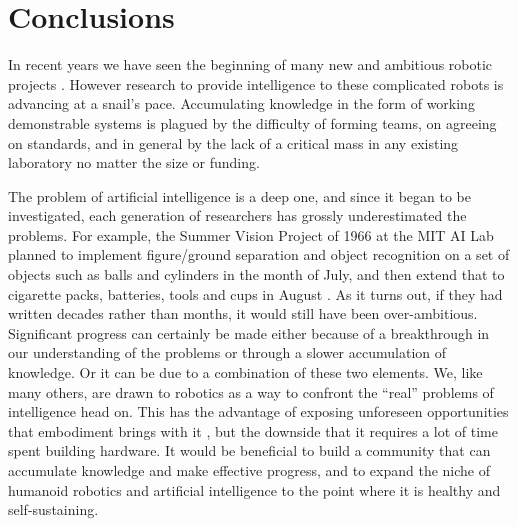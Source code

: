
\section{Conclusions}

In recent years we have seen the beginning of many new and 
ambitious robotic projects 
\cite{02-c59-Hirai-1998,02-c59-Kaneko-2004,adams00humanoid,02-c59-Sakagami-2002}. 
%
However research to provide intelligence 
to these complicated robots is advancing at a snail's pace.
%
Accumulating knowledge in the form of working demonstrable systems is 
plagued by the difficulty of forming teams, on agreeing on standards, and 
in general by the lack of a critical mass in any existing laboratory no 
matter the size or funding. 

The problem of artificial intelligence is a deep one, and since
it began to be investigated, each
generation of researchers has grossly underestimated the problems.
%
For example, the Summer Vision Project of 1966 at the
MIT AI Lab planned to implement figure/ground separation
and object recognition on a set of objects such as balls and
cylinders in the month of July, and then extend that to cigarette
packs, batteries, tools and cups in August \cite{papert66summer}.
%
As it turns out, if they had written decades rather than months, it
would still have been over-ambitious.
%
%
Significant progress can certainly be made either 
because of a breakthrough in our understanding of the problems or through 
a slower accumulation of knowledge. Or it can be due to a combination of 
these two elements. 
%
%
We, like many others, are drawn to robotics as a way to confront the 
``real'' problems of intelligence head on.
This has the advantage of exposing unforeseen opportunities that
embodiment brings with it \cite{YARB}, but the downside that
it requires a lot of time spent building hardware.
%
It would be beneficial to build a community
that can accumulate knowledge and make effective progress,
and to expand the niche of
humanoid robotics and artificial intelligence to the point where it 
is healthy and self-sustaining.

